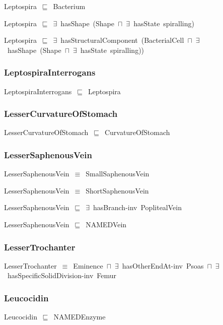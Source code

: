 \documentclass{article}
\begin{document}
Leptospira~\ensuremath{\sqsubseteq}~Bacterium~

Leptospira~\ensuremath{\sqsubseteq}~\ensuremath{\exists}~hasShape~(Shape~\ensuremath{\sqcap}~\ensuremath{\exists}~hasState~spiralling)~

Leptospira~\ensuremath{\sqsubseteq}~\ensuremath{\exists}~hasStructuralComponent~(BacterialCell~\ensuremath{\sqcap}~\ensuremath{\exists}~hasShape~(Shape~\ensuremath{\sqcap}~\ensuremath{\exists}~hasState~spiralling))~

\subsubsection*{LeptospiraInterrogans}

LeptospiraInterrogans~\ensuremath{\sqsubseteq}~Leptospira~

\subsubsection*{LesserCurvatureOfStomach}

LesserCurvatureOfStomach~\ensuremath{\sqsubseteq}~CurvatureOfStomach~

\subsubsection*{LesserSaphenousVein}

LesserSaphenousVein~\ensuremath{\equiv}~SmallSaphenousVein

LesserSaphenousVein~\ensuremath{\equiv}~ShortSaphenousVein

LesserSaphenousVein~\ensuremath{\sqsubseteq}~\ensuremath{\exists}~hasBranch-inv~PoplitealVein~

LesserSaphenousVein~\ensuremath{\sqsubseteq}~NAMEDVein~

\subsubsection*{LesserTrochanter}

LesserTrochanter~\ensuremath{\equiv}~Eminence~\ensuremath{\sqcap}~\ensuremath{\exists}~hasOtherEndAt-inv~Psoas~\ensuremath{\sqcap}~\ensuremath{\exists}~hasSpecificSolidDivision-inv~Femur

\subsubsection*{Leucocidin}

Leucocidin~\ensuremath{\sqsubseteq}~NAMEDEnzyme~
\end{document}
